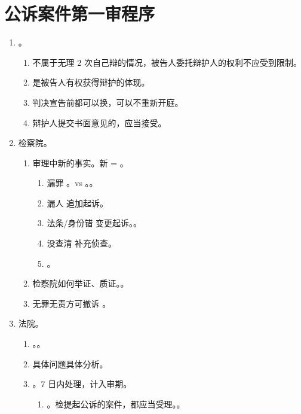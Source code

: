 \section{公诉案件第一审程序}
\begin{enumerate}
  \item {}。
        \begin{enumerate}
          \item 不属于无理 2 次自己辩的情况，被告人委托辩护人的权利不应受到限制。
          \item 是被告人有权获得辩护的体现。
          \item 判决宣告前都可以换，可以不重新开庭。
          \item 辩护人提交书面意见的，应当接受。
        \end{enumerate}
  \item 检察院。
        \begin{enumerate}
          \item 审理中新的事实。新 = 。
                \begin{enumerate}
                  \item 漏罪 \yjt {}。vs 。。
                  \item 漏人 \yjt 追加起诉。
                  \item 法条/身份错 \yjt 变更起诉。\sjt {}。
                  \item 没查清 \yjt 补充侦查。
                  \item {}。
                \end{enumerate}
          \item 检察院如何举证、质证。。
          \item 无罪无责方可撤诉 \yjt {}。
        \end{enumerate}
  \item 法院。
        \begin{enumerate}
          \item {}。。
          \item {}具体问题具体分析。
          \item {}。7 日内处理，计入审期。
                \begin{enumerate}
                  \item {}。检提起公诉的案件，都应当受理。。

\end{enumerate}
\end{enumerate}
\end{enumerate}
